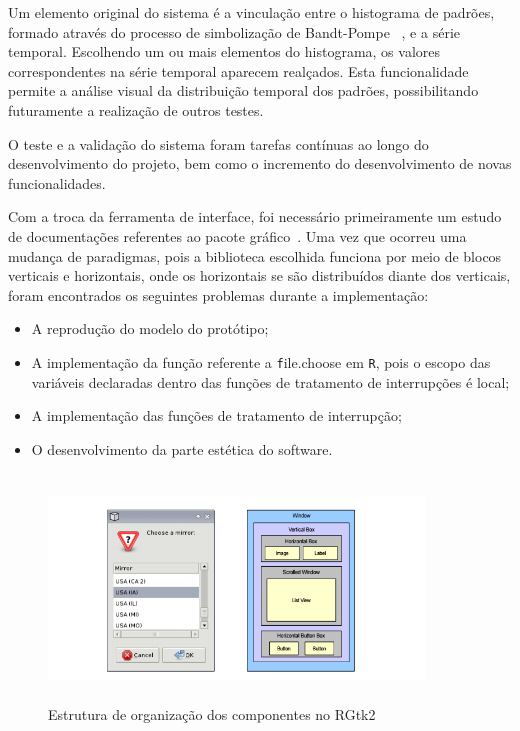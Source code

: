Um elemento original do sistema é a vinculação entre o histograma de padrões, formado através do processo de simbolização de Bandt-Pompe ~\citep{Bandt2002Permutation}, e a série temporal. 
Escolhendo um ou mais elementos do histograma, os valores correspondentes na série temporal aparecem realçados. 
Esta funcionalidade permite a análise visual da distribuição temporal dos padrões, possibilitando futuramente a realização de outros testes.
 
O teste e a validação do sistema foram tarefas contínuas ao longo do desenvolvimento do projeto, bem como o incremento do desenvolvimento de novas funcionalidades. 

Com a troca da ferramenta de interface, foi necessário primeiramente um estudo de documentações referentes ao pacote gráfico~\citep{rgtk2}. 
Uma vez que ocorreu uma mudança de paradigmas, pois a biblioteca escolhida funciona por meio de blocos verticais e horizontais, onde os horizontais se são distribuídos diante dos verticais, foram encontrados os seguintes problemas durante a implementação:

\begin{itemize}
\item A reprodução do modelo do protótipo;
\item A implementação da função referente a \texttt file.choose em \texttt R, pois o escopo das variáveis declaradas dentro das funções de tratamento de interrupções é local;
\item A implementação das funções de tratamento de interrupção;
\item O desenvolvimento da parte estética do software.
\end{itemize}

\begin{figure}
  \centering
  \caption{Estrutura de organização dos componentes no RGtk2}
   \includegraphics[width=10cm,height=6cm]{capitulos/imagens/rgtk2.png}
\end{figure}
  
